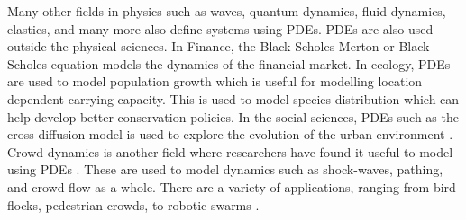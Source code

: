 Many other fields in physics such as waves, quantum dynamics, fluid dynamics, elastics, and many more also define systems using PDEs. PDEs are also used outside the physical sciences. In Finance, the Black-Scholes-Merton or Black-Scholes equation models the dynamics of the financial market. In ecology, PDEs are used to model population growth which is useful for modelling location dependent carrying capacity. This is used to model species distribution which can help develop better conservation policies. In the social sciences, PDEs such as the cross-diffusion model is used to explore the evolution of the urban environment \autocite{jinDetectingInteractionUrban2023}. Crowd dynamics is another field where researchers have found it useful to model using PDEs \autocite{mukherjeeLagrangianApproachModeling2015,hughesFlowLargeCrowds2000}. These are used to model dynamics such as shock-waves, pathing, and crowd flow as a whole. There are a variety of applications, ranging from bird flocks, pedestrian crowds, to robotic swarms \autocite{gongCrowdDynamicsModeling2023}.

